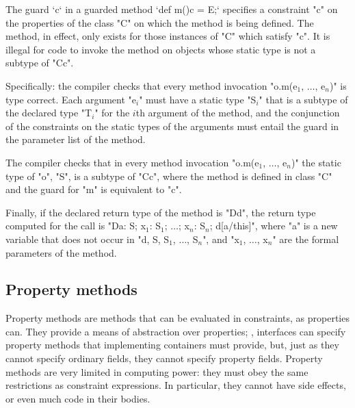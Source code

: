 The guard \xcd`{c}` 
in a guarded method 
\xcd`def m(){c} = E;`
specifies a constraint \xcd"c" on the
properties of the class \xcd"C" on which the method is being defined. The
method, in effect, only exists  for those instances of \xcd"C" which satisfy
\xcd"c".  It is 
illegal for code to invoke the method on objects whose static type is
not a subtype of \xcd"C{c}".

Specifically: 
    the compiler checks that every method invocation
    \xcdmath"o.m(e$_1$, $\dots$, e$_n$)"
    is type correct. Each argument
    \xcdmath"e$_i$" must have a
    static type \xcdmath"S$_i$" that is a subtype of the declared type
    \xcdmath"T$_i$" for the $i$th
    argument of the method, and the conjunction of the constraints on the
    static types 
    of the arguments must entail the guard in the parameter list
    of the method.

    The compiler checks that in every method invocation
    \xcdmath"o.m(e$_1$, $\dots$, e$_n$)"
    the static type of \xcd"o", \xcd"S", is a subtype of \xcd"C{c}", where the method
    is defined in class \xcd"C" and the guard for \xcd"m" is equivalent to
    \xcd"c".

    Finally, if the declared return type of the method is
    \xcd"D{d}", the
    return type computed for the call is
    \xcdmath"D{a: S; x$_1$: S$_1$; $\dots$; x$_n$: S$_n$; d[a/this]}",
    where \xcd"a" is a new
    variable that does not occur in
    \xcdmath"d, S, S$_1$, $\dots$, S$_n$", and
    \xcdmath"x$_1$, $\dots$, x$_n$" are the formal
    parameters of the method.




\subsection{Property methods}


Property methods are methods that can be evaluated in constraints, as
properties can.   They provide a means of abstraction over properties; \eg,
interfaces can specify property methods that implementing containers must
provide, but, just as they cannot specify ordinary fields, they cannot specify
property fields.   Property methods are very limited in computing power: they
must obey the same restrictions as constraint expressions.  In particular,
they cannot have side effects, or even much code in their bodies.


